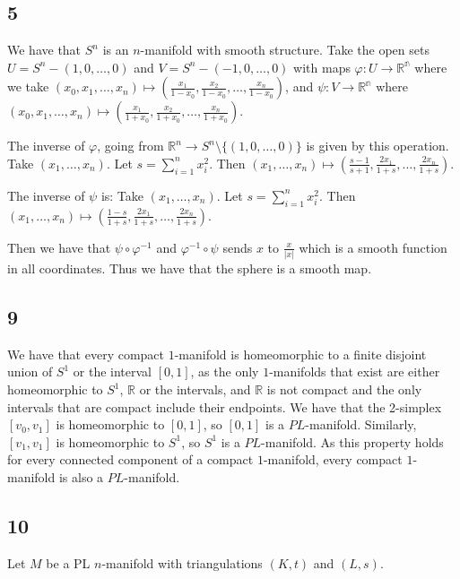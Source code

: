 \documentclass{article}
\theoremstyle{definition}
\numberwithin{theorem}{section}
\numberwithin{equation}{section}
\begin{document}
\subsection{5}
We have that $S^n$ is an $n$-manifold with smooth structure. Take the open sets $U = S^n - (1, 0, \ldots, 0)$ and $V = S^n - (-1, 0, \ldots, 0)$ with maps $\varphi : U \rightarrow \mathbb{R^n}$ where we take $(x_0, x_1, \ldots, x_n) \mapsto (\frac{x_1}{1- x_0}, \frac{x_2}{1- x_0}, \ldots, \frac{x_n}{1- x_0} )$, and $\psi : V \rightarrow \mathbb{R^n}$ where $(x_0, x_1, \ldots, x_n) \mapsto (\frac{x_1}{1+x_0}, \frac{x_2}{1+ x_0}, \ldots, \frac{x_n}{1+x_0} )$. 

The inverse of $\varphi$, going from $\mathbb{R}^n \rightarrow S^n\setminus \{(1, 0, \ldots, 0)\}$ is given by this operation. Take $(x_1, \ldots, x_n)$. Let $s = \sum_{i = 1}^n x_i^2$. Then $(x_1, \ldots, x_n) \mapsto (\frac{s - 1}{s + 1}, \frac{2x_1}{1 + s}, \ldots, \frac{2x_n}{1 + s})$. 

The inverse of $\psi$ is: Take $(x_1, \ldots, x_n)$. Let $s = \sum_{i = 1}^n x_i^2$. Then $(x_1, \ldots, x_n) \mapsto (\frac{1 - s}{1 + s}, \frac{2x_1}{1 + s}, \ldots, \frac{2x_n}{1 + s})$. 

Then we have that $\psi \circ \varphi^{-1}$ and $\varphi^{-1} \circ \psi$ sends $x$ to $ \frac{x}{|x|}$ which is a smooth function in all coordinates. Thus we have that the sphere is a smooth map. 
\subsection{9}
We have that every compact $1$-manifold is homeomorphic to a finite disjoint union of $S^1$ or the interval $[0,1]$, as the only $1$-manifolds that exist are either homeomorphic to $S^1$, $\mathbb{R}$ or the intervals, and $\mathbb{R}$ is not compact and the only intervals that are compact include their endpoints. We have that the 2-simplex $[v_0, v_1]$ is homeomorphic to $[0,1]$, so $[0,1]$ is a $PL$-manifold. Similarly, $[v_1, v_1]$ is homeomorphic to $S^1$, so $S^1$ is a $PL$-manifold. As this property holds for every connected component of a compact $1$-manifold, every compact $1$-manifold is also a $PL$-manifold. 

\subsection{10}
Let $M$ be a PL $n$-manifold with triangulations $(K, t)$ and $(L, s)$. 
\end{document}
